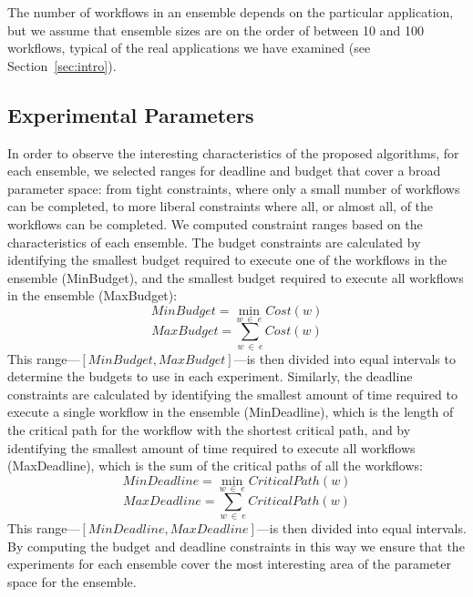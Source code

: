 \documentclass[conference]{IEEEtran}
\begin{document}
The number of workflows in an ensemble depends on the particular application,
but we assume that ensemble sizes are on the order of between 10 and 100
workflows, typical of the real applications we have examined (see Section~\ref{sec:intro}). 



\subsection{Experimental Parameters}
\label{sec:exp-parameters}

In order to observe the interesting characteristics of the proposed algorithms,
for each ensemble, we selected ranges for deadline and budget that cover a broad
parameter space: from tight constraints, where only a small number of workflows can be completed,
to more liberal constraints where all, or almost all, of the workflows can be
completed. We computed constraint ranges based on
the characteristics of each ensemble. The budget constraints are calculated by
identifying the smallest budget required to execute one of the workflows in the
ensemble (MinBudget), and the smallest budget required to execute all workflows
in the ensemble (MaxBudget):
%
$$
MinBudget = \min_{w\ \in\ e}{Cost(w)}
$$
$$
MaxBudget = \sum_{w\ \in\ e}{Cost(w)}
$$
%
This range---$[MinBudget, MaxBudget]$---is then divided into equal intervals to
determine the budgets to use in each experiment. Similarly, the deadline
constraints are calculated by identifying the smallest amount
of time required to execute a single workflow in the ensemble (MinDeadline),
which is the length of the critical path for the workflow with the shortest
critical path, and by identifying the smallest amount of time required to
execute all workflows (MaxDeadline), which is the sum of the critical paths of
all the workflows:
%
$$
MinDeadline = \min_{w\ \in\ e}{CriticalPath(w)}
$$
$$
MaxDeadline = \sum_{w\ \in\ e}{CriticalPath(w)}
$$
%
This range---$[MinDeadline, MaxDeadline]$---is then divided into equal intervals. 
By computing the budget and deadline constraints in this way we ensure that the
experiments for each ensemble cover the most interesting area of the parameter space for the
ensemble.
\end{document}
